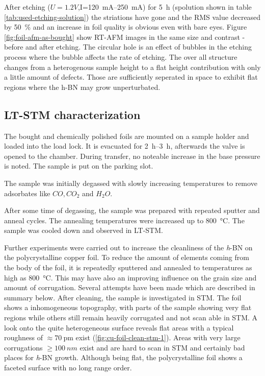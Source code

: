 	After etching ($U=1.2V$,I=\SIrange{120}{250}{\mA}) for \SI{5}{\hour} (spolution shown in table \ref{tab:used-etching-solution}) the striations have gone and the RMS value decreased by \SI{50}{\percent} and an increase in foil quality is obvious even with bare eyes. Figure \ref{fig:foil-afm-as-bought} show RT-AFM images in the same size and contrast - before  and after  etching.
	The circular hole is an effect of bubbles in the etching process where the bubble affects the rate of etching. The over all structure changes from a heterogenous sample height to a flat height contribution with only a little amount of defects. Those are sufficiently seperated in space to exhibit flat regions where the h-BN may grow unperturbated.
	
\subsection{LT-STM characterization}
\label{section:foil-STM}
The bought and chemically polished foils are mounted on a sample holder and loaded into the load lock. It is evacuated for \SIrange{2}{3}{\hour}, afterwards the valve is opened to the chamber. During transfer, no noteable increase in the base pressure is noted. The sample is put on the parking slot.
		
The sample was initially degassed with slowly increasing temperatures to remove adsorbates like $CO, CO_2$ and $H_2O$.
		
After some time of degassing, the sample was prepared with repeated sputter and anneal cycles. The annealing temperatures were increased up to \SI{800}{\degreeCelsius}. 
The sample was cooled down and observed in LT-STM.
		
Further experiments were carried out to increase the cleanliness of the \textit{h}-BN on the polycrystalline copper foil. To reduce the amount of elements coming from the body of the foil, it is repeatedly sputtered and annealed to temperatures as high as \SI{800}{\celsius}. This may have also an improving influence on the grain size and amount of corrugation. Several attempts have been made which are described in summary below.
After cleaning, the sample is investigated in STM. The foil shows a inhomogeneous topography, with parts of the sample showing very flat regions while others still remain heavily corrugated and not scan able in STM.  A look onto the quite heterogeneous surface reveals flat areas with a typical roughness of $\approx \SI{70}{\pico\meter}$ exist (\autoref{fig:cu-foil-clean-stm-1}). Areas with very large corrugations $\geq \SI{100}{nm}$ exist and are hard to scan in STM and certainly bad places for \textit{h}-BN growth. Although being flat, the polycrystalline foil shows a faceted surface with no long range order.

